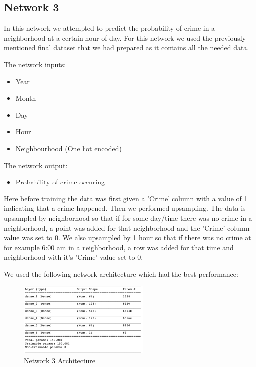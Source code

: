 \documentclass[conference]{IEEEtran}
\begin{document}
\subsection{Network 3 \cite{Network_3}}

In this network we attempted to predict the probability of crime in a neighborhood at a certain hour of day.
For this network we used the previously mentioned final dataset that we had prepared \cite{finalcrime}
as it contains all the needed data. 

The network inputs:

\begin{itemize}
  \item Year
  \item Month
  \item Day
  \item Hour
  \item Neighbourhood (One hot encoded)
\end{itemize}

The network output:

\begin{itemize}
  \item Probability of crime occuring\\
\end{itemize}

Here before training the data was first given a 'Crime' column with a value of 1 indicating that a crime happened. Then
we performed upsampling. The data is upsampled by neighborhood so that if for some day/time there was no crime in a neighborhood,
a point was added for that neighborhood and the 'Crime' column value was set to 0. We also upsampled by 1 hour so that if there was
no crime at for example 6:00 am in a neighborhood, a row was added for that time and neighborhood with it's 'Crime' value set to 0.

We used the following network architecture which had the best performance:

\begin{figure}[H]
  \centering
  \captionsetup{justification=centering}
  \centering
  \includegraphics[width=2.5in]{15.png}
  \caption{Network 3 Architecture}  
  \label{1}
\end{figure}
\end{document}
